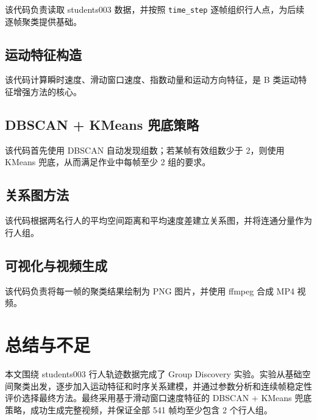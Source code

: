 \documentclass[UTF8,a4paper,12pt]{ctexart}
\begin{document}


该代码负责读取 students003 数据，并按照 \texttt{time\_step} 逐帧组织行人点，为后续逐帧聚类提供基础。

\subsection{运动特征构造}



该代码计算瞬时速度、滑动窗口速度、指数动量和运动方向特征，是 B 类运动特征增强方法的核心。

\subsection{DBSCAN + KMeans 兜底策略}



该代码首先使用 DBSCAN 自动发现组数；若某帧有效组数少于 2，则使用 KMeans 兜底，从而满足作业中每帧至少 2 组的要求。

\subsection{关系图方法}



该代码根据两名行人的平均空间距离和平均速度差建立关系图，并将连通分量作为行人组。

\subsection{可视化与视频生成}



该代码负责将每一帧的聚类结果绘制为 PNG 图片，并使用 ffmpeg 合成 MP4 视频。

\section{总结与不足}

本文围绕 students003 行人轨迹数据完成了 Group Discovery 实验。实验从基础空间聚类出发，逐步加入运动特征和时序关系建模，并通过参数分析和连续帧稳定性评价选择最终方法。最终采用基于滑动窗口速度特征的 DBSCAN + KMeans 兜底策略，成功生成完整视频，并保证全部 541 帧均至少包含 2 个行人组。
\end{document}
